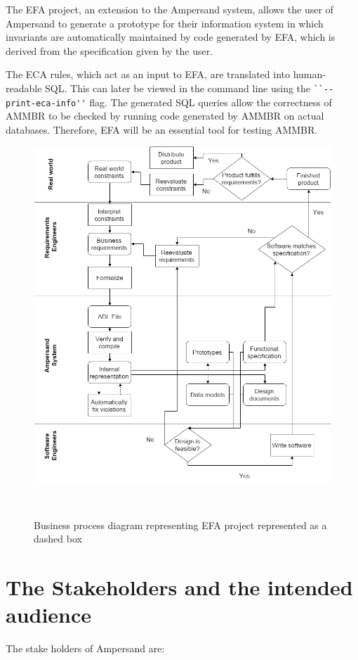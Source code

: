 The EFA project, an extension to the Ampersand system, allows 
the user of Ampersand to generate a prototype for their information
system in which invariants are automatically maintained by code 
generated by EFA, which is derived from the specification given by the user.

The ECA rules, which act as an input to EFA, are translated into human-readable
SQL. This can later be viewed in the command line using the
\verb|``--print-eca-info''| flag.  The generated SQL queries allow the
correctness of AMMBR to be checked by running code generated by AMMBR on actual
databases. Therefore, EFA will be an essential tool for testing AMMBR.

\begin{figure}[!htb]
\begin{center}
\includegraphics[width=\textwidth]{../figures/business_process}
\caption{Business process diagram representing EFA project represented as a dashed box}~\label{fig:EFAproject}
\end{center}
\end{figure}

\section{The Stakeholders and the intended audience}\label{sec:Stakeholders}
The stake holders of Ampersand are:

